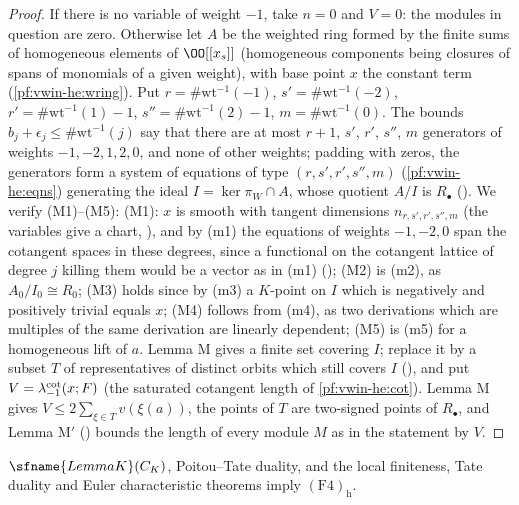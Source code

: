 \begin{proof}
If there is no variable of weight $-1$, take $n=0$ and $V=0$: the modules in question are zero. Otherwise let $A$ be the weighted ring
formed by the finite sums of homogeneous elements of $\OO[[x_s]]$ (homogeneous components being closures of spans of monomials of
a given weight), with base point $x$ the constant term (\cref{pf:vwin-he:wring}). Put $r=\#\mathrm{wt}^{-1}(-1)$, $s'=\#\mathrm{wt}^{-1}(-2)$,
$r'=\#\mathrm{wt}^{-1}(1)-1$, $s''=\#\mathrm{wt}^{-1}(2)-1$, $m=\#\mathrm{wt}^{-1}(0)$. The bounds $b_j+\epsilon_j\le\#\mathrm{wt}^{-1}(j)$ say that there are at most
$r+1$, $s'$, $r'$, $s''$, $m$ generators of weights $-1,-2,1,2,0$, and none of other weights; padding with zeros, the generators form a
system of equations of type $(r,s',r',s'',m)$ (\cref{pf:vwin-he:eqns}) generating the ideal $I=\ker\pi_W\cap A$, whose quotient $A/I$ is
$R_\bullet$ (). We verify (M1)--(M5):
(M1): $x$ is smooth with tangent dimensions $n_{r,s',r',s'',m}$ (the variables give a chart,
), and by (m1) the equations of weights $-1,-2,0$ span the cotangent
spaces in these degrees, since a functional on the cotangent lattice of degree $j$ killing them would be a vector as in (m1)
(); (M2) is (m2), as $A_0/I_0\cong R_0$; (M3) holds since by (m3) a
$K$-point on $I$ which is negatively and positively trivial equals $x$; (M4) follows from (m4), as two derivations which are multiples of the
same derivation are linearly dependent; (M5) is (m5) for a homogeneous lift of $a$. Lemma M gives a finite set covering $I$; replace it by
a subset $T$ of representatives of distinct orbits which still covers $I$
(), and put $V=\lambda^{\mathrm{cot}}_{-1}(x;F)$ (the
saturated cotangent length of \cref{pf:vwin-he:cot}). Lemma M gives $V\le2\sum_{\xi\in T}v(\xi(a))$, the points of $T$ are two-signed points of
$R_\bullet$, and Lemma M$'$ () bounds the length of
every module $M$ as in the statement by $V$.
\end{proof}

\begin{proposition}\label{pf:eis:vanE}
$\sfname{LemmaK}(C_K)$, Poitou--Tate duality, and the local finiteness, Tate duality and Euler characteristic theorems imply
$(\mathrm{F4})_{\mathrm h}$.
\end{proposition}

